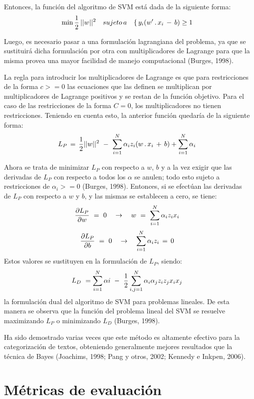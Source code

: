 {Entonces, la funci\'on del algoritmo de SVM est\'a dada de la siguiente forma:
$$
\min {1 \over 2} \, ||w||^{2} \quad sujeto \, a \quad \lbrace \, y_{i}(w' \, . \, x_{i} \, - \, b) \ge 1
$$

Luego, es necesario pasar a una formulaci\'on lagrangiana del problema, ya que se sustituir\'a dicha formulaci\'on por otra con multiplicadores de Lagrange para que la misma provea una mayor facilidad de manejo computacional (Burges, 1998).
\newline

La regla para introducir los multiplicadores de Lagrange es que para restricciones de la forma $ c>=0$ las ecuaciones que las definen se multiplican por multiplicadores de Lagrange positivos y se restan de la funci\'on objetivo. Para el caso de las restricciones de la forma $C=0$, los multiplicadores no tienen restricciones. Teniendo en cuenta esto, la anterior funci\'on quedar\'ia de la siguiente forma:
$$
L_{P} \, = \, {1 \over 2} ||w||^{2} \ - \ \sum_{i=1}^N \alpha_{i} z_{i} (w \, . \, x_{i} \, + \, b) + \sum_{i=1}^N \alpha_{i}
$$

Ahora se trata de minimizar $L_{P}$ con respecto a $w$, $b$ y a la vez exigir que las derivadas de $L_{P}$ con respecto a todos los $\alpha$ se anulen; todo esto sujeto a restricciones de $\alpha_{i}>=0$ (Burges, 1998). Entonces, si se efect\'uan las derivadas de $L_{P}$ con respecto a $w$ y $b$, y las mismas se establecen a cero, se tiene:
$$
{\partial L_{P} \over \partial w} \ = \ 0 \quad \rightarrow \quad w \ = \ \sum_{i=1}^N \alpha_{i} z_{i} x_{i}$$
$$
{\partial L_{P} \over \partial b} \ = \ 0 \quad \rightarrow \quad \sum_{i=1}^N \alpha_{i} z_{i} \, = \, 0
$$
Estos valores se sustituyen en la formulaci\'on de $L_{P}$, siendo:
$$
L_{D} \ = \sum_{i=1}^N \alpha{i} \ - \ {1 \over 2} \sum_{i,j=1}^N \alpha_{i} \alpha_{j} z_{i} z_{j} x_{i} x_{j}
$$
la formulaci\'on dual del algoritmo de SVM para problemas lineales. De esta manera se observa que la funci\'on del problema lineal del SVM se resuelve maximizando $L_{P}$ o minimizando $L_{D}$ (Burges, 1998).
\newline

Ha sido demostrado varias veces que este m\'etodo es altamente efectivo para la categorizaci\'on de textos, obteniendo generalmente mejores resultados que la t\'ecnica de Bayes (Joachims, 1998; Pang y otros, 2002; Kennedy e Inkpen, 2006).

\section{M\'etricas de evaluaci\'on}

}
